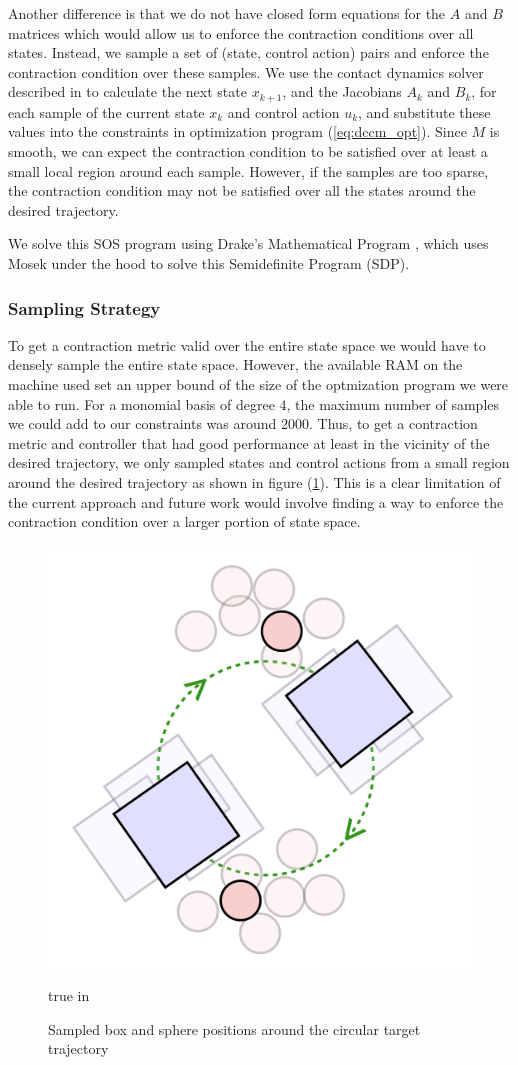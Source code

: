 \documentclass[journal]{IEEEtran}
\begin{document}
Another difference is that we do not have closed form equations for the $A$ and $B$ matrices which would allow us to enforce the contraction conditions over all states. Instead, we sample a set of (state, control action) pairs and enforce the contraction condition over these samples. We use the contact dynamics solver described in \autocite{pangGlobalPlanningContactRich2023} to calculate the next state $x_{k+1}$, and the Jacobians $A_k$ and $B_k$, for each sample of the current state $x_k$ and control action $u_k$, and substitute these values into the constraints in optimization program (\ref{eq:dccm_opt}). Since $M$ is smooth, we can expect the contraction condition to be satisfied over at least a small local region around each sample. However, if the samples are too sparse, the contraction condition may not be satisfied over all the states around the desired trajectory.

We solve this SOS program using Drake's Mathematical Program \autocite{DrakeModelBasedDesign}, which uses Mosek under the hood to solve this Semidefinite Program (SDP).

\subsubsection{Sampling Strategy}
To get a contraction metric valid over the entire state space we would have to densely sample the entire state space. However, the available RAM on the machine used set an upper bound of the size of the optmization program we were able to run. For a monomial basis of degree $4$, the maximum number of samples we could add to our constraints was around $2000$. Thus, to get a contraction metric and controller that had good performance at least in the vicinity of the desired trajectory, we only sampled states and control actions from a small region around the desired trajectory as shown in figure (\ref{fig:sampling_strategy}). This is a clear limitation of the current approach and future work would involve finding a way to enforce the contraction condition over a larger portion of state space.

\begin{figure}[h]
	\centering\includegraphics[width = 0.3 \textwidth]
	{figures/sampling_strategy.png}
    \caption{Sampled box and sphere positions around the circular target trajectory}
	\label{fig:sampling_strategy}
	 true in
\end{figure}
\end{document}
